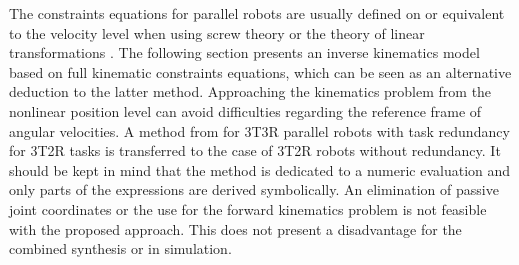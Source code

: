 \documentclass[
	graybox,
	vecphys] %
	{svmult}
\newcommand{\bm}[1]{\boldsymbol{#1}}
\newcommand{\ks}[1]{{(\mathrm{CS})}_{#1}}
\begin{document}
The constraints equations for parallel robots are usually defined on or equivalent to the velocity level when using screw theory \cite{KongGos2007} or the theory of linear transformations \cite{Gogu2008}.
The following section presents an inverse kinematics model based on full kinematic constraints equations, which can be seen as an alternative deduction to the latter method.
Approaching the kinematics problem from the nonlinear position level can avoid difficulties regarding the reference frame of angular velocities.
A method from \cite{SchapplerTapOrt2019} for 3T3R parallel robots with task redundancy for 3T2R tasks is transferred to the case of 3T2R robots without redundancy.
It should be kept in mind that the method is dedicated to a numeric evaluation and only parts of the expressions are derived symbolically.
An elimination of passive joint coordinates or the use for the forward kinematics problem is not feasible with the proposed approach.
This does not present a disadvantage for the combined synthesis or in simulation. %


\end{document}
